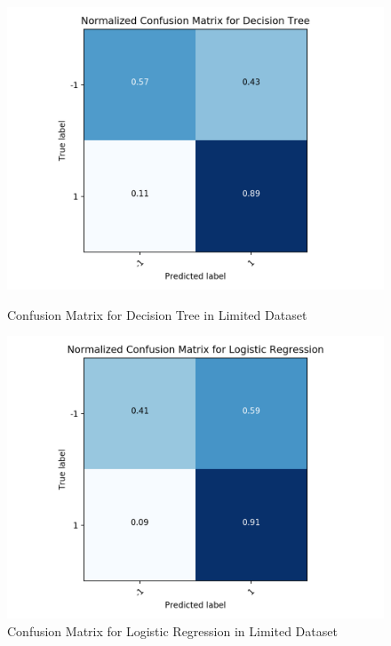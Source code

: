\documentclass[a0]{a0poster}
\begin{document}
\begin{textblock}{7.0}
\begin{figure}
\centering
\begin{minipage}{0.48\linewidth}

\includegraphics[width=\linewidth]{confusion_tree_limited}
\caption{Confusion Matrix for Decision Tree in Limited Dataset}
\label{fig:confusion_tree_limited}
\end{minipage}\hfill
\begin{minipage}{0.48\linewidth}

\includegraphics[width=\linewidth]{logreg_limited}
\caption{Confusion Matrix for Logistic Regression in Limited Dataset}
\label{fig:logreg_limited}
 \end{minipage}
\end{figure}


\end{textblock}
\end{document}

